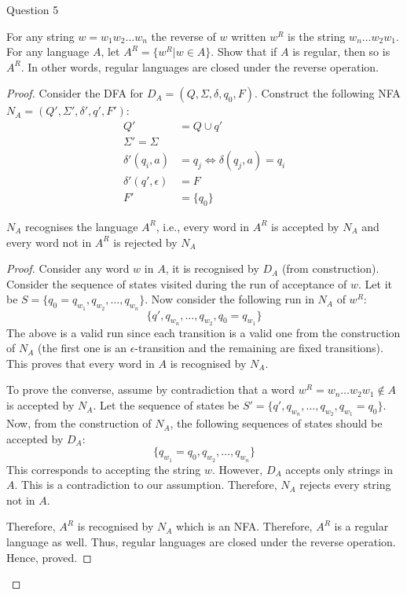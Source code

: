 \begin{solution}{Question 5}\label{ques:5}
	\begin{question}
		For any string $w = w_1w_2\ldots w_n$ the reverse of $w$ written $w^R$ is the string $w_n\ldots w_2w_1$. For any language $A$, let $A^R = \{w^R | w\in A\}$. Show that if $A$ is regular, then so is $A^R$. In other words, regular languages are closed under the reverse operation.
	\end{question}
	\tcblower{}
	\begin{proof}
		Consider the DFA for $D_A = (Q, \Sigma, \delta, q_0, F)$. Construct the following NFA $N_A = (Q', \Sigma', \delta', q', F')$:
		\begin{equation}
			\begin{split}
				Q' &= Q \cup q'\\
				\Sigma' = \Sigma\\
				\delta'(q_i, a) &= q_j \iff \delta(q_j, a) = q_i\\
				\delta'(q', \epsilon) &= F\\
				F' &= \{q_0\}
			\end{split}
		\end{equation}
		\begin{claim}
			$N_A$ recognises the language $A^R$, i.e., every word in $A^R$ is accepted by $N_A$ and every word not in $A^R$ is rejected by $N_A$
		\end{claim}
		\begin{proof}
			Consider any word $w$ in $A$, it is recognised by $D_A$ (from construction). Consider the sequence of states visited during the run of acceptance of $w$. Let it be $S = \{q_0=q_{w_1}, q_{w_2}, \ldots, q_{w_n}\}$. Now consider the following run in $N_A$ of $w^R$:
			\begin{equation}
				\{q', q_{w_n}, \ldots, q_{w_2}, q_0=q_{w_1}\}
			\end{equation}
			The above is a valid run since each transition is a valid one from the construction of $N_A$ (the first one is an $\epsilon$-transition and the remaining are fixed transitions). This proves that every word in $A$ is recognised by $N_A$.\par
			To prove the converse, assume by contradiction that a word $w^R = w_n\ldots w_2w_1 \not\in A$ is accepted by $N_A$. Let the sequence of states be $S' = \{q', q_{w_n}, \ldots, q_{w_2}, q_{w_1}=q_0\}$. Now, from the construction of $N_A$, the following sequences of states should be accepted by $D_A$:
			\begin{equation}
				\{q_{w_1}=q_0, q_{w_2}, \ldots, q_{w_n}\}
			\end{equation}
			This corresponds to accepting the string $w$. However, $D_A$ accepts only strings in $A$. This is a contradiction to our assumption. Therefore, $N_A$ rejects every string not in $A$.\par
			Therefore, $A^R$ is recognised by $N_A$ which is an NFA. Therefore, $A^R$ is a regular language as well. Thus, regular languages are closed under the reverse operation. Hence, proved.
		\end{proof}
	\end{proof}
\end{solution}
